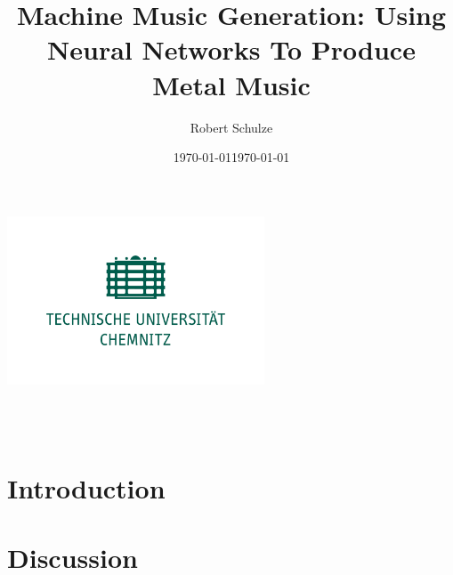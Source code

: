 \documentclass[a4paper, 11pt]{report}
\author{Robert Schulze}
\title{Machine Music Generation: Using Neural Networks To Produce Metal Music}
\date{\today}
\begin{document}
\begin{titlepage}
    \begin{center}
        \includegraphics[height=5cm]{tuc-gruen.png}
        
        \begin{large}
            \thetitle \\
            \theauthor \\
            \date{\today}  

        \end{large}
        
    \end{center}
\end{titlepage}


\renewcommand{\thechapter}{\Roman{chapter}}

\maketitle
\setcounter{page}{1} %

\tableofcontents

\chapter{Introduction}

\cite{zukowski2018generating}

\chapter{Discussion}



\end{document}
